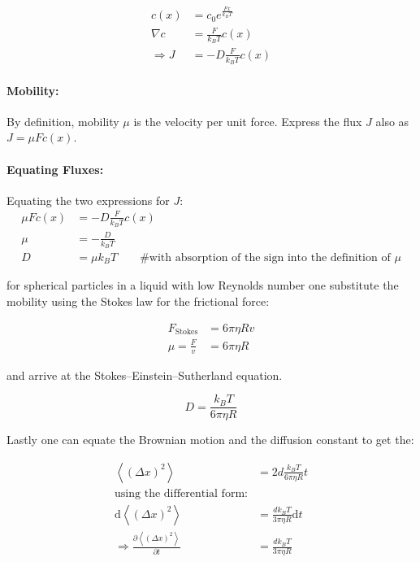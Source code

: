 \documentclass[12pt,english,ngerman]{scrartcl}
\begin{document}
\begin{align*}
	c(x)          & = c_0 e^{\frac{Fx}{k_BT}} \\
	\nabla c      & = \frac{F}{k_BT} c(x)     \\
	\Rightarrow J & = -D \frac{F}{k_BT} c(x)
\end{align*}

\paragraph{Mobility:} By definition, mobility $\mu$ is the velocity per unit force. Express the flux
$J$ also as $J=\mu Fc(x)$.

\paragraph{Equating Fluxes:} Equating the two expressions for $J$:
\begin{align*}
	\mu Fc(x) & = -D \frac{F}{k_BT} c(x)                                                  \\
	\mu       & = -\frac{D}{k_BT}                                                         \\
	D         & = \mu k_BT\qquad \# \text{with absorption of the sign into the definition
		of } \mu
\end{align*}

for spherical particles in a liquid with low Reynolds number one substitute the
mobility using the Stokes law for the frictional force:

\begin{align*}
	F_\text{Stokes}   & = 6 \pi \eta R v \\
	\mu = \frac{F}{v} & = 6 \pi \eta R
\end{align*}

and arrive at the Stokes–Einstein–Sutherland
equation.\cite{einsteinUberMolekularkinetischenTheorie1905}

\begin{equation}
	D = \frac{k_B T}{6 \pi \eta R}
	\label{eq:sto_ein_sut}
\end{equation}

Lastly one can equate the Brownian motion and the diffusion constant to get
the:

\begin{align}
	\left \langle (\Delta x)^2 \right \rangle                                         & = 2 d \frac{k_B T}{6 \pi \eta R} t                   \\
	\text{using the differential form:}                                               &                                                      \\
	\text{d}\left \langle (\Delta x)^2 \right \rangle                                 & =  \frac{d k_B T}{3 \pi \eta R} \text{d}t            \\
	\Rightarrow \frac{\partial \left \langle (\Delta x)^2 \right \rangle}{\partial t} & =  \frac{d k_B T}{3 \pi \eta R}\label{eq:slope_visc}
\end{align}
\end{document}
